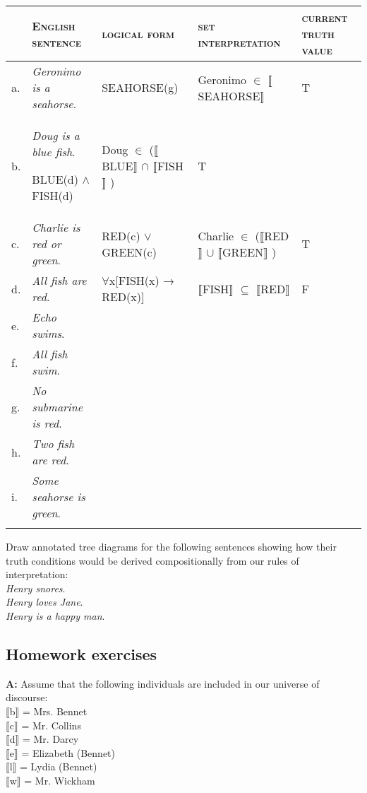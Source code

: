 \begin{tabularx}{\textwidth}{lQQQQ}
\lsptoprule
& \bfseries\scshape English sentence & \bfseries\scshape logical form & \bfseries\scshape set interpretation & \textbf{\textsc{current truth value}}\\
\midrule
a. & \textit{Geronimo is a seahorse}. & SEAHORSE(g) & Geronimo ${\in}$ \textsc{$\llbracket$}SEAHORSE$\rrbracket$  & T\\
b. & \textit{Doug is a blue fish}.

BLUE(d) $\wedge$ \textsc{FISH}(d) & Doug ${\in}$ (\textsc{$\llbracket$}BLUE$\rrbracket$  ${\cap}$ \textsc{$\llbracket$FISH}$\rrbracket$ ) & T & \\
c. & \textit{Charlie is red or green}. & RED(c) $\vee$ GREEN(c) & Charlie ${\in}$ (\textsc{$\llbracket$}RED$\rrbracket$  ${\cup}$ \textsc{$\llbracket$}GREEN$\rrbracket$ ) & T\\
d. & \textit{All fish are red}. & ${\forall}$x[\textsc{FISH}(x) → RED(x)] & \textsc{$\llbracket$FISH}$\rrbracket$  ${\subseteq}$ \textsc{$\llbracket$}RED$\rrbracket$  & F\\
e. & \textit{Echo swims}. &  &  & \\
f. & \textit{All fish swim}. &  &  & \\
g. & \textit{No submarine is red}. &  &  & \\
h. & \textit{Two fish are red}. &  &  & \\
i. & \textit{Some seahorse is green}. &  &  & \\
\lspbottomrule
\end{tabularx}

\ea \label{ex:13.}%
    \label{ex:key:3}
    Draw annotated tree diagrams for the following sentences showing how their truth conditions would be derived compositionally from our rules of interpretation:\\
\ea \label{ex:13.} \textit{Henry snores}.\\
\ex \textit{Henry loves Jane}.\\
\ex \textit{Henry is a happy man}.
                       \z
    \z

\subsection*{Homework exercises}
\begin{stylepoints}
\textbf{A:} Assume that the following individuals are included in our universe of discourse:\\
{}$\llbracket$b$\rrbracket$  = Mrs. Bennet\\
{}$\llbracket$c$\rrbracket$  = Mr. Collins\\
{}$\llbracket$d$\rrbracket$  = Mr. Darcy\\
{}$\llbracket$e$\rrbracket$  = Elizabeth (Bennet)\\
{}$\llbracket$l$\rrbracket$  = Lydia (Bennet)\\
{}$\llbracket$w$\rrbracket$  = Mr. Wickham
\end{stylepoints}

